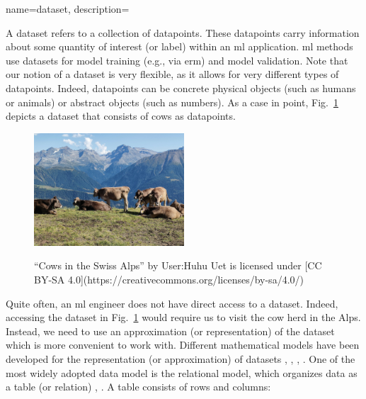 {name={dataset},
	description={A dataset refers to a collection of \gls{datapoint}s. These 
		\gls{datapoint}s carry information about some quantity of interest (or \gls{label}) within 
		an \gls{ml} application. \gls{ml} methods use datasets for \gls{model} training (e.g., via \gls{erm})
		and \gls{model} \gls{validation}. Note that our notion of a dataset is very flexible, as 
		it allows for very different types of \gls{datapoint}s. Indeed, \gls{datapoint}s can be concrete 
		physical objects (such as humans or animals) or abstract objects (such as numbers). 
		As a case in point, Fig.\ \ref{fig_cows_dataset} depicts a dataset that consists of cows as 
		\gls{datapoint}s. 
		\begin{figure}[H]
				\begin{center}
		\label{fig:cowsintheswissalps}
		\includegraphics[width=0.5\textwidth]{assets/Cows_in_the_Swiss_Alps}
		  \end{center}
		\caption{\label{fig_cows_dataset}“Cows in the Swiss Alps” by User:Huhu Uet is licensed under [CC BY-SA 4.0](https://creativecommons.org/licenses/by-sa/4.0/)}
	  \end{figure}
       Quite often, an \gls{ml} engineer does not have direct access to a dataset. Indeed, accessing the 
       dataset in Fig.\ \ref{fig_cows_dataset} would require us to visit the cow herd in the Alps. Instead, 
       we need to use an approximation (or representation) of the dataset which is more convenient 
       to work with. Different mathematical \gls{model}s have been developed for the representation (or approximation) 
       of datasets \cite{silberschatz2019database}, \cite{abiteboul1995foundations}, \cite{hoberman2009data}, \cite{ramakrishnan2002database}. 
       One of the most widely adopted data \gls{model} is the relational \gls{model}, which organizes \gls{data} 
       as a table (or relation) \cite{codd1970relational}, \cite{silberschatz2019database}.
		A table consists of rows and columns:
		\begin{itemize} 

\end{itemize}}}

